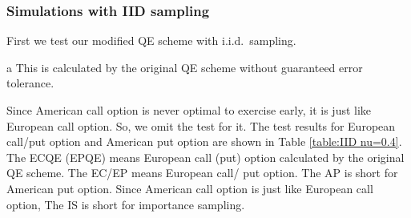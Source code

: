 \documentclass{ws-ijfe}
\begin{document}
\subsubsection{Simulations with IID sampling}
First we test our modified QE scheme with i.i.d.\ sampling.
 \begin{table}[h]
\caption{Test of option price with IID\_MC}
\centering
\begin{threeparttable}
\begin{tablenotes}
  \item[a] This is calculated by the original QE scheme without guaranteed error tolerance.
\end{tablenotes}
\end{threeparttable}
\label{table:IID nu=0.4}
\end{table}
Since American call option is never optimal to exercise early, it is just like European call option. So, we omit the test for it. The test results for European call/put option and American put option are shown in Table \ref{table:IID nu=0.4}. The ECQE (EPQE) means European call (put) option calculated by the original QE scheme. The EC/EP means European call/ put option. The AP is short for American put option. Since American call option is just like European call option, The IS is short for importance sampling.
\end{document}
